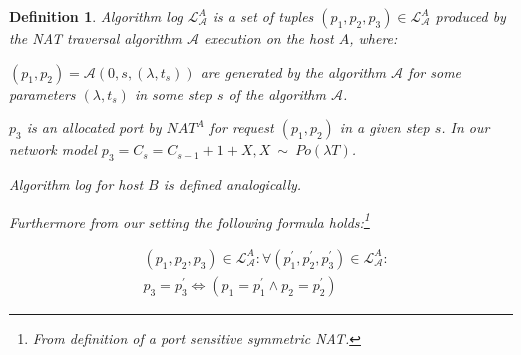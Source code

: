 \documentclass{llncs}
\newtheorem{mydef}{Definition}
\begin{document}
\begin{mydef}
\label{def:log}
Algorithm log $\mathcal{L}^A_{\mathcal{A}}$ is a set of tuples $(p_1, p_2, p_3) \in \mathcal{L}^A_{\mathcal{A}}$ produced
by the NAT traversal algorithm $\mathcal{A}$ execution on the host $A$, where: \\

\begin{compactitem}
 \item $(p_1, p_2) = \mathcal{A}(0, s, (\lambda, t_s)) $ are generated by the algorithm $\mathcal{A}$ for some 
       parameters $(\lambda, t_s)$ in some step $s$ of the algorithm $\mathcal{A}$.
 \item $p_3$ is an allocated port by $NAT^A$ for request $(p_1, p_2)$ in a given step $s$. In our network model
       $p_3=C_s=C_{s-1} + 1 + X, X~\sim~Po(\lambda T)$.
 \item Algorithm log for host $B$ is defined analogically.
 \item Furthermore from our setting the following formula holds:\footnote{From definition of a port sensitive symmetric NAT.}
\end{compactitem} %
%
%
\begin{align*}
& (p_1, p_2, p_3) \in \mathcal{L}^A_{\mathcal{A}}: \forall (p_1^{\prime}, p_2^{\prime}, p_3^{\prime}) \in \mathcal{L}^{A}_{\mathcal{A}} :\\
& p_3 = p_3^{\prime} \Leftrightarrow \left( p_1=p^{\prime}_1 \wedge p_2=p^{\prime}_2 \right)
\end{align*}
\end{mydef}
\end{document}
